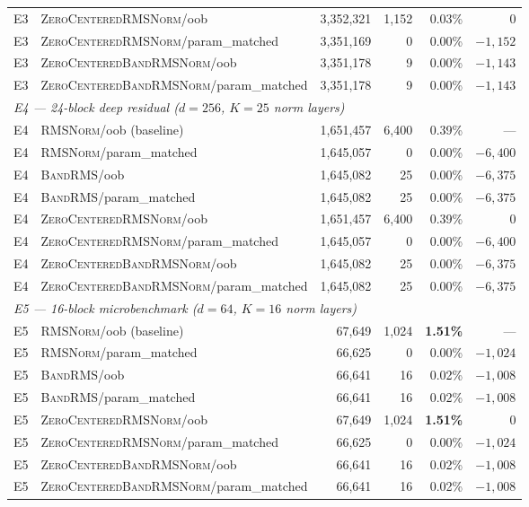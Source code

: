 \documentclass{article}
\newcommand{\rms}{\textsc{RMSNorm}}
\newcommand{\bandrms}{\textsc{BandRMS}}
\newcommand{\zcrms}{\textsc{ZeroCentered}\-\textsc{RMSNorm}}
\newcommand{\zcband}{\textsc{ZeroCentered}\-\textsc{BandRMSNorm}}
\begin{document}
\begin{table}[H]
{\begin{tabular}{llrrrr}
E3 & \zcrms{}/oob                   & 3{,}352{,}321 & 1{,}152 & 0.03\% & $0$ \\
E3 & \zcrms{}/param\_matched        & 3{,}351{,}169 & 0       & 0.00\% & $-1{,}152$ \\
E3 & \zcband{}/oob                  & 3{,}351{,}178 & 9       & 0.00\% & $-1{,}143$ \\
E3 & \zcband{}/param\_matched       & 3{,}351{,}178 & 9       & 0.00\% & $-1{,}143$ \\
\midrule
\multicolumn{6}{l}{\textit{E4 --- 24-block deep residual ($d{=}256$, $K{=}25$ norm layers)}}\\
E4 & \rms{}/oob (baseline)          & 1{,}651{,}457 & 6{,}400 & 0.39\% & --- \\
E4 & \rms{}/param\_matched          & 1{,}645{,}057 & 0       & 0.00\% & $-6{,}400$ \\
E4 & \bandrms{}/oob                 & 1{,}645{,}082 & 25      & 0.00\% & $-6{,}375$ \\
E4 & \bandrms{}/param\_matched      & 1{,}645{,}082 & 25      & 0.00\% & $-6{,}375$ \\
E4 & \zcrms{}/oob                   & 1{,}651{,}457 & 6{,}400 & 0.39\% & $0$ \\
E4 & \zcrms{}/param\_matched        & 1{,}645{,}057 & 0       & 0.00\% & $-6{,}400$ \\
E4 & \zcband{}/oob                  & 1{,}645{,}082 & 25      & 0.00\% & $-6{,}375$ \\
E4 & \zcband{}/param\_matched       & 1{,}645{,}082 & 25      & 0.00\% & $-6{,}375$ \\
\midrule
\multicolumn{6}{l}{\textit{E5 --- 16-block microbenchmark ($d{=}64$, $K{=}16$ norm layers)}}\\
E5 & \rms{}/oob (baseline)          & 67{,}649 & 1{,}024 & \textbf{1.51\%} & --- \\
E5 & \rms{}/param\_matched          & 66{,}625 & 0       & 0.00\% & $-1{,}024$ \\
E5 & \bandrms{}/oob                 & 66{,}641 & 16      & 0.02\% & $-1{,}008$ \\
E5 & \bandrms{}/param\_matched      & 66{,}641 & 16      & 0.02\% & $-1{,}008$ \\
E5 & \zcrms{}/oob                   & 67{,}649 & 1{,}024 & \textbf{1.51\%} & $0$ \\
E5 & \zcrms{}/param\_matched        & 66{,}625 & 0       & 0.00\% & $-1{,}024$ \\
E5 & \zcband{}/oob                  & 66{,}641 & 16      & 0.02\% & $-1{,}008$ \\
E5 & \zcband{}/param\_matched       & 66{,}641 & 16      & 0.02\% & $-1{,}008$ \\
\bottomrule
\end{tabular}%
}
\end{table}
\end{document}
